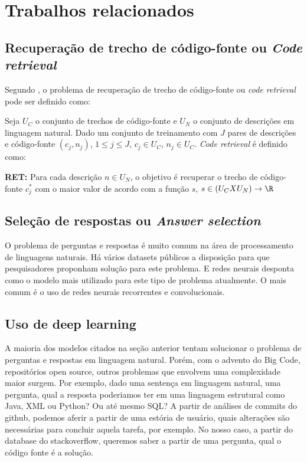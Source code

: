 \chapter{Trabalhos relacionados}
\label{cap:trabalhos-relacionados}



\section{Recuperação de trecho de código-fonte ou \textit{Code retrieval}}
\label{sec:code-retrieval}

Segundo \cite{iyer-etal-2016-summarizing}, o problema de recuperação de trecho de código-fonte ou \textit{code retrieval} pode ser definido como:

Seja $U_{C}$ o conjunto de trechos de código-fonte e $U_{N}$ o conjunto de descrições em linguagem natural. Dado um conjunto de treinamento com $J$ pares de descrições e código-fonte $(c_{j}, n_{j})$, $1 \leq j \leq J$, $c_{j} \in U_{C}$, $n_{j} \in U_{C}$. \textit{Code retrieval} é definido como:

\textbf{RET:} Para cada descrição $n \in U_{N}$, o objetivo é recuperar o trecho de código-fonte $c_{j}^{*}$ com o maior valor de acordo com a função $s$, $s \in (U_{C} X U_{N}) \rightarrow \R$

\section{Seleção de respostas ou \textit{Answer selection}}
\label{sec:answer-selection}

O problema de perguntas e respostas é muito comum na área de processamento de linguagens naturais. Há vários datasets públicos a disposição para que pesquisadores proponham solução para este problema. E redes neurais desponta como o modelo mais utilizado para este tipo de problema atualmente. O mais comum é o uso de redes neurais recorrentes e convolucionais. 


\section{Uso de deep learning}
\label{sec:uso-deep-learning}

A maioria dos modelos citados na seção anterior tentam solucionar o problema de perguntas e respostas em linguagem natural. Porém, com o advento do Big Code, repositórios open source, outros problemas que envolvem uma complexidade maior surgem. Por exemplo, dado uma sentença em linguagem natural, uma pergunta, qual a resposta poderiamos ter em uma linguagem estrutural como Java, XML ou Python? Ou até mesmo SQL? A partir de análises de commits do github, podemos aferir a partir de uma estória de usuário, quais alterações são necessárias para concluir aquela tarefa, por exemplo. No nosso caso, a partir do database do stackoverflow, queremos saber a partir de uma pergunta, qual o código fonte é a solução.
